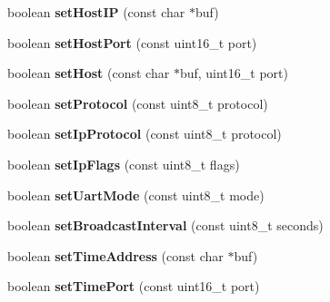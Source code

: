 \begin{DoxyCompactItemize}
\item 
\hypertarget{class_wi_fly_a55043e802c6bdadf785700cf186c5f5f}{
boolean {\bfseries set\-Host\-I\-P} (const char $\ast$buf)}
\label{class_wi_fly_a55043e802c6bdadf785700cf186c5f5f}

\item 
\hypertarget{class_wi_fly_a9c4e9871eee6453d55183eb227611bd2}{
boolean {\bfseries set\-Host\-Port} (const uint16\-\_\-t port)}
\label{class_wi_fly_a9c4e9871eee6453d55183eb227611bd2}

\item 
\hypertarget{class_wi_fly_a2e6c2a4e46fa5557801bafe9e1dca861}{
boolean {\bfseries set\-Host} (const char $\ast$buf, uint16\-\_\-t port)}
\label{class_wi_fly_a2e6c2a4e46fa5557801bafe9e1dca861}

\item 
\hypertarget{class_wi_fly_a90f41105b905cafb8e26278b6f8ea547}{
boolean {\bfseries set\-Protocol} (const uint8\-\_\-t protocol)}
\label{class_wi_fly_a90f41105b905cafb8e26278b6f8ea547}

\item 
\hypertarget{class_wi_fly_a8b207278eafdf77b9d10ad27a3a2fab7}{
boolean {\bfseries set\-Ip\-Protocol} (const uint8\-\_\-t protocol)}
\label{class_wi_fly_a8b207278eafdf77b9d10ad27a3a2fab7}

\item 
\hypertarget{class_wi_fly_a0d738ca58d890b66f91797b7fd5a99bf}{
boolean {\bfseries set\-Ip\-Flags} (const uint8\-\_\-t flags)}
\label{class_wi_fly_a0d738ca58d890b66f91797b7fd5a99bf}

\item 
\hypertarget{class_wi_fly_ac18e40634a63dbf50b3ef9f199883148}{
boolean {\bfseries set\-Uart\-Mode} (const uint8\-\_\-t mode)}
\label{class_wi_fly_ac18e40634a63dbf50b3ef9f199883148}

\item 
\hypertarget{class_wi_fly_a74493dbef1319125e8e83fed96f597ea}{
boolean {\bfseries set\-Broadcast\-Interval} (const uint8\-\_\-t seconds)}
\label{class_wi_fly_a74493dbef1319125e8e83fed96f597ea}

\item 
\hypertarget{class_wi_fly_a677c7457fa01700dfed099a5640be163}{
boolean {\bfseries set\-Time\-Address} (const char $\ast$buf)}
\label{class_wi_fly_a677c7457fa01700dfed099a5640be163}

\item 
\hypertarget{class_wi_fly_a20453217520ae24b523c3bfc92096ec8}{
boolean {\bfseries set\-Time\-Port} (const uint16\-\_\-t port)}
\label{class_wi_fly_a20453217520ae24b523c3bfc92096ec8}


\end{DoxyCompactItemize}
